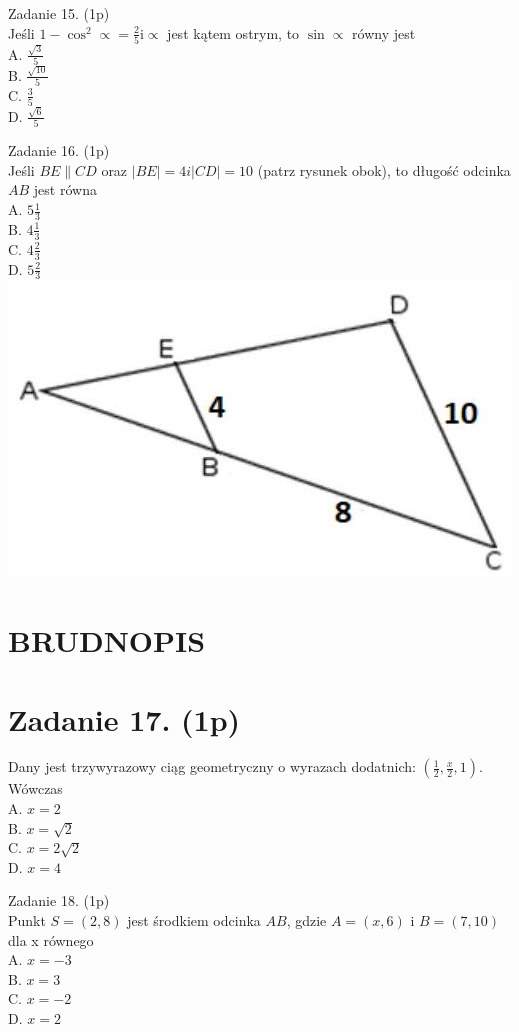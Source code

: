 \documentclass[10pt]{article}
\begin{document}
Zadanie 15. (1p)\\
Jeśli \(1-\cos ^{2} \propto=\frac{2}{5} \mathrm{i} \propto\) jest kątem ostrym, to \(\sin \propto\) równy jest\\
A. \(\frac{\sqrt{3}}{5}\)\\
B. \(\frac{\sqrt{10}}{5}\)\\
C. \(\frac{3}{5}\)\\
D. \(\frac{\sqrt{6}}{5}\)

Zadanie 16. (1p)\\
Jeśli \(B E \| C D\) oraz \(|B E|=4 i|C D|=10\) (patrz rysunek obok), to długość odcinka \(A B\) jest równa\\
A. \(5 \frac{1}{3}\)\\
B. \(4 \frac{1}{3}\)\\
C. \(4 \frac{2}{3}\)\\
D. \(5 \frac{2}{3}\)\\
\includegraphics[max width=\textwidth, center]{2024_11_21_be8c615186155473dc68g-04}

\section*{BRUDNOPIS}
\section*{Zadanie 17. (1p)}
Dany jest trzywyrazowy ciąg geometryczny o wyrazach dodatnich: \(\left(\frac{1}{2}, \frac{x}{2}, 1\right)\). Wówczas\\
A. \(x=2\)\\
B. \(x=\sqrt{2}\)\\
C. \(x=2 \sqrt{2}\)\\
D. \(x=4\)

Zadanie 18. (1p)\\
Punkt \(S=(2,8)\) jest środkiem odcinka \(A B\), gdzie \(A=(x, 6)\) i \(B=(7,10)\) dla x równego\\
A. \(x=-3\)\\
B. \(x=3\)\\
C. \(x=-2\)\\
D. \(x=2\)
\end{document}
